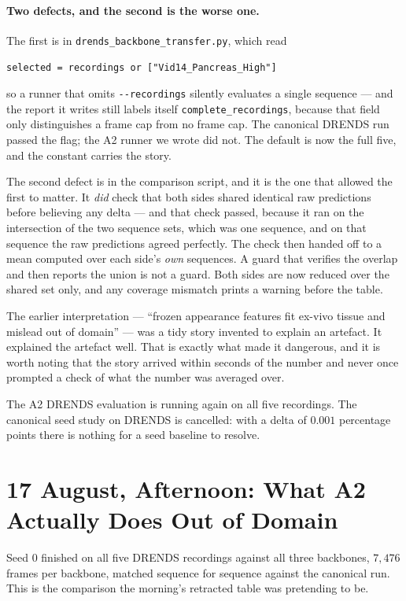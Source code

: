 \documentclass[11pt,a4paper]{article}
\begin{document}
\paragraph{Two defects, and the second is the worse one.} The first is in
\texttt{drends\_backbone\_transfer.py}, which read

\begin{center}
\texttt{selected = recordings or ["Vid14\_Pancreas\_High"]}
\end{center}

so a runner that omits \texttt{-{}-recordings} silently evaluates a single
sequence --- and the report it writes still labels itself
\texttt{complete\_recordings}, because that field only distinguishes a
frame cap from no frame cap. The canonical DRENDS run passed the flag; the
A2 runner we wrote did not. The default is now the full five, and the
constant carries the story.

The second defect is in the comparison script, and it is the one that
allowed the first to matter. It \emph{did} check that both sides shared
identical raw predictions before believing any delta --- and that check
passed, because it ran on the intersection of the two sequence sets, which
was one sequence, and on that sequence the raw predictions agreed
perfectly. The check then handed off to a mean computed over each side's
\emph{own} sequences. A guard that verifies the overlap and then reports
the union is not a guard. Both sides are now reduced over the shared set
only, and any coverage mismatch prints a warning before the table.

The earlier interpretation --- ``frozen appearance features fit ex-vivo
tissue and mislead out of domain'' --- was a tidy story invented to
explain an artefact. It explained the artefact well. That is exactly what
made it dangerous, and it is worth noting that the story arrived within
seconds of the number and never once prompted a check of what the number
was averaged over.

The A2 DRENDS evaluation is running again on all five recordings. The
canonical seed study on DRENDS is cancelled: with a delta of $0.001$
percentage points there is nothing for a seed baseline to resolve.


\section*{17 August, Afternoon: What A2 Actually Does Out of Domain}

Seed $0$ finished on all five DRENDS recordings against all three
backbones, $7{,}476$ frames per backbone, matched sequence for sequence
against the canonical run. This is the comparison the morning's retracted
table was pretending to be.
\end{document}
